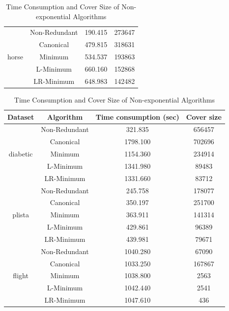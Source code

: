 \documentclass[11pt]{book}
\begin{document}
\begin{table}[H]
\begin{tabular}{|c|c|c|c|}
    \hline
    \multirow{5}{*}{horse}
    	& Non-Redundant & 190.415 & 273647  \\
    	& Canonical     & 479.815 & 318631  \\
    	& Minimum       & 534.537 & 193863   \\
    	& L-Minimum     & 660.160 & 152868   \\
    	& LR-Minimum    & 648.983 & 142482   \\	
    	
    \hline
    
\end{tabular}

	\caption{Time Consumption and Cover Size of Non-exponential Algorithms}
	
\end{table}

\begin{table}[H]

	\centering
	
\begin{tabular}{|c|c|c|c|}

    \hline
    Dataset & Algorithm & Time consumption (sec) & Cover size \\
    
    \hline
    \multirow{5}{*}{diabetic}
    	& Non-Redundant & 321.835  & 656457 \\
    	& Canonical     & 1798.100 & 702696 \\
    	& Minimum       & 1154.360 & 234914 \\
    	& L-Minimum     & 1341.980 & 89483  \\
    	& LR-Minimum    & 1331.660 & 83712  \\	

    \hline
    \multirow{5}{*}{plista}
    	& Non-Redundant & 245.758 & 178077 \\
    	& Canonical     & 350.197 & 251700 \\
    	& Minimum       & 363.911 & 141314 \\
    	& L-Minimum     & 429.861 & 96389  \\
    	& LR-Minimum    & 439.981 & 79671  \\
    	
    \hline
    \multirow{5}{*}{flight}
    	& Non-Redundant & 1040.280 & 67090  \\
    	& Canonical     & 1033.250 & 167867 \\
    	& Minimum       & 1038.800 & 2563   \\
    	& L-Minimum     & 1042.440 & 2541   \\
    	& LR-Minimum    & 1047.610 & 436    \\
    	
    \hline
    
\end{tabular}

	\caption{Time Consumption and Cover Size of Non-exponential Algorithms}
	
\end{table}
\end{document}

